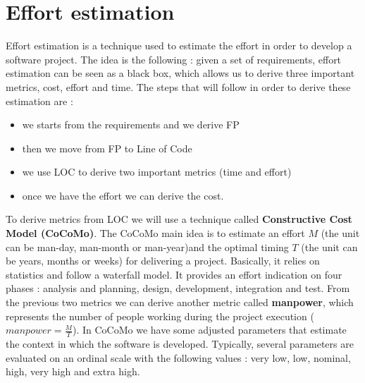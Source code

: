 \documentclass[11pt]{article}
\begin{document}
\section{Effort estimation}
Effort estimation is a technique used to estimate the effort in order to develop a software project. The idea is the following : given a set of requirements, effort estimation can be seen as a black box, which allows us to derive three important metrics, cost, effort and time. The steps that will follow in order to derive these estimation are :
\begin{itemize}
\item we starts from the requirements and we derive FP
\item then we move from FP to Line of Code
\item we use LOC to derive two important metrics (time and effort)
\item once we have the effort we can derive the cost.
\end{itemize}
To derive metrics from LOC we will use a technique called \textbf{Constructive Cost Model (CoCoMo)}. The CoCoMo main idea is to estimate an effort $M$ (the unit can be man-day, man-month or man-year)and the optimal timing $T$ (the unit can be years, months or weeks) for delivering a project. Basically, it relies on statistics and follow a waterfall model. It provides an effort indication on four phases : analysis and planning, design, development, integration and test. From the previous two metrics we can derive another metric called \textbf{manpower}, which represents the number of people working during the project execution ($manpower = \frac{M}{T}$). In CoCoMo we have some adjusted parameters that estimate the context in which the software is developed. Typically, several parameters are evaluated on an ordinal scale with the following values : very low, low, nominal, high, very high and extra high.
\end{document}
